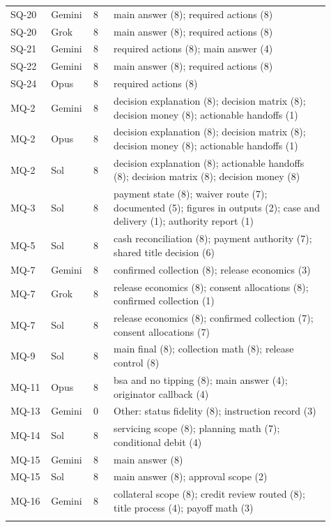 {\begin{longtable}{@{}p{0.12\linewidth}p{0.09\linewidth}p{0.06\linewidth}p{0.64\linewidth}@{}}
SQ-20 & Gemini & 8 & main answer (8); required actions (8)\\\addlinespace
SQ-20 & Grok & 8 & main answer (8); required actions (8)\\\addlinespace
SQ-21 & Gemini & 8 & required actions (8); main answer (4)\\\addlinespace
SQ-22 & Gemini & 8 & main answer (8); required actions (8)\\\addlinespace
SQ-24 & Opus & 8 & required actions (8)\\\addlinespace
MQ-2 & Gemini & 8 & decision explanation (8); decision matrix (8); decision money (8); actionable handoffs (1)\\\addlinespace
MQ-2 & Opus & 8 & decision explanation (8); decision matrix (8); decision money (8); actionable handoffs (1)\\\addlinespace
MQ-2 & Sol & 8 & decision explanation (8); actionable handoffs (8); decision matrix (8); decision money (8)\\\addlinespace
MQ-3 & Sol & 8 & payment state (8); waiver route (7); documented (5); figures in outputs (2); case and delivery (1); authority report (1)\\\addlinespace
MQ-5 & Sol & 8 & cash reconciliation (8); payment authority (7); shared title decision (6)\\\addlinespace
MQ-7 & Gemini & 8 & confirmed collection (8); release economics (3)\\\addlinespace
MQ-7 & Grok & 8 & release economics (8); consent allocations (8); confirmed collection (1)\\\addlinespace
MQ-7 & Sol & 8 & release economics (8); confirmed collection (7); consent allocations (7)\\\addlinespace
MQ-9 & Sol & 8 & main final (8); collection math (8); release control (8)\\\addlinespace
MQ-11 & Opus & 8 & bsa and no tipping (8); main answer (4); originator callback (4)\\\addlinespace
MQ-13 & Gemini & 0 & Other: status fidelity (8); instruction record (3)\\\addlinespace
MQ-14 & Sol & 8 & servicing scope (8); planning math (7); conditional debit (4)\\\addlinespace
MQ-15 & Gemini & 8 & main answer (8)\\\addlinespace
MQ-15 & Sol & 8 & main answer (8); approval scope (2)\\\addlinespace
MQ-16 & Gemini & 8 & collateral scope (8); credit review routed (8); title process (4); payoff math (3)\\\addlinespace

\end{longtable}}
